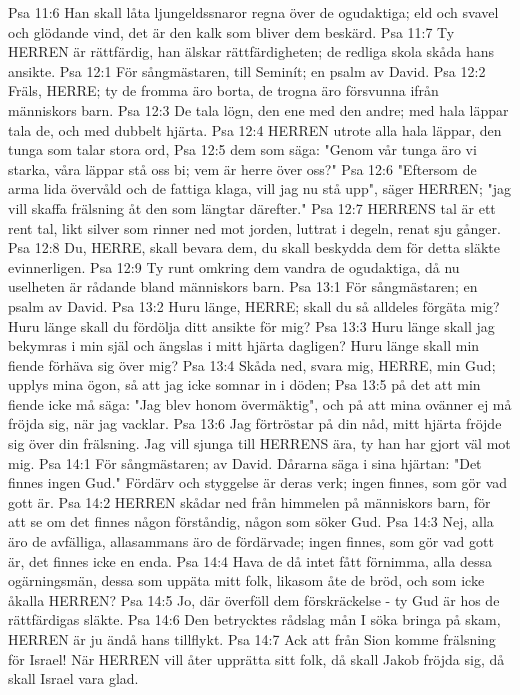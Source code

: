 Psa 11:6  Han skall låta ljungeldssnaror regna över de ogudaktiga; eld och svavel och glödande vind, det är den kalk som bliver dem beskärd.
Psa 11:7  Ty HERREN är rättfärdig, han älskar rättfärdigheten; de redliga skola skåda hans ansikte.
Psa 12:1  För sångmästaren, till Seminít; en psalm av David.
Psa 12:2  Fräls, HERRE; ty de fromma äro borta, de trogna äro försvunna ifrån människors barn.
Psa 12:3  De tala lögn, den ene med den andre; med hala läppar tala de, och med dubbelt hjärta.
Psa 12:4  HERREN utrote alla hala läppar, den tunga som talar stora ord,
Psa 12:5  dem som säga: "Genom vår tunga äro vi starka, våra läppar stå oss bi; vem är herre över oss?"
Psa 12:6  "Eftersom de arma lida övervåld och de fattiga klaga, vill jag nu stå upp", säger HERREN; "jag vill skaffa frälsning åt den som längtar därefter."
Psa 12:7  HERRENS tal är ett rent tal, likt silver som rinner ned mot jorden, luttrat i degeln, renat sju gånger.
Psa 12:8  Du, HERRE, skall bevara dem, du skall beskydda dem för detta släkte evinnerligen.
Psa 12:9  Ty runt omkring dem vandra de ogudaktiga, då nu uselheten är rådande bland människors barn.
Psa 13:1  För sångmästaren; en psalm av David.
Psa 13:2  Huru länge, HERRE; skall du så alldeles förgäta mig? Huru länge skall du fördölja ditt ansikte för mig?
Psa 13:3  Huru länge skall jag bekymras i min själ och ängslas i mitt hjärta dagligen? Huru länge skall min fiende förhäva sig över mig?
Psa 13:4  Skåda ned, svara mig, HERRE, min Gud; upplys mina ögon, så att jag icke somnar in i döden;
Psa 13:5  på det att min fiende icke må säga: "Jag blev honom övermäktig", och på att mina ovänner ej må fröjda sig, när jag vacklar.
Psa 13:6  Jag förtröstar på din nåd, mitt hjärta fröjde sig över din frälsning. Jag vill sjunga till HERRENS ära, ty han har gjort väl mot mig.
Psa 14:1  För sångmästaren; av David. Dårarna säga i sina hjärtan: "Det finnes ingen Gud." Fördärv och styggelse är deras verk; ingen finnes, som gör vad gott är.
Psa 14:2  HERREN skådar ned från himmelen på människors barn, för att se om det finnes någon förståndig, någon som söker Gud.
Psa 14:3  Nej, alla äro de avfälliga, allasammans äro de fördärvade; ingen finnes, som gör vad gott är, det finnes icke en enda.
Psa 14:4  Hava de då intet fått förnimma, alla dessa ogärningsmän, dessa som uppäta mitt folk, likasom åte de bröd, och som icke åkalla HERREN?
Psa 14:5  Jo, där överföll dem förskräckelse - ty Gud är hos de rättfärdigas släkte.
Psa 14:6  Den betrycktes rådslag mån I söka bringa på skam, HERREN är ju ändå hans tillflykt.
Psa 14:7  Ack att från Sion komme frälsning för Israel! När HERREN vill åter upprätta sitt folk, då skall Jakob fröjda sig, då skall Israel vara glad.
